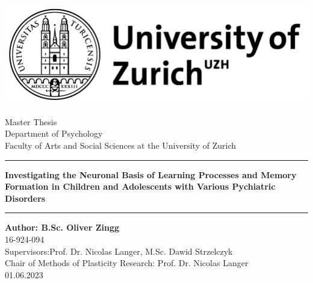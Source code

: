 \begin{titlepage}

\begin{minipage}{\textwidth}
 	\vspace{-40pt}
	\begin{flushleft}
	    		\includegraphics[scale=.25]{uzhlogo}

	\end{flushleft}
\end{minipage}

\vspace{60pt}

	\begin{center}
	
		\large Master Thesis\\
		\large Department of Psychology\\[3pt]
		\large Faculty of Arts and Social Sciences at the University of Zurich\\[40pt]
\hrule
    \vspace{0.5cm}
		\LARGE \textbf{Investigating the Neuronal Basis of Learning Processes and Memory Formation in Children and Adolescents with Various Pychiatric Disorders}\\
			\vspace{0.5cm}
\hrule

		\vspace{1cm}
		\large \textbf{Author: B.Sc. Oliver Zingg}\\
		16-924-094\\[80pt]
		
		\large Supervisors:Prof. Dr. Nicolas Langer, M.Sc. Dawid Strzelczyk\\[20pt]
		Chair of Methods of Plasticity Research: Prof. Dr. Nicolas Langer\\
		

		\large 01.06.2023\\
	\end{center}
\end{titlepage}